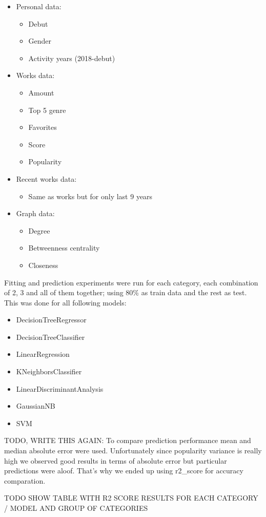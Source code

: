 \begin{itemize}
	\item Personal data:
	\begin{itemize}
		\item Debut
		\item Gender
		\item Activity years (2018-debut)
	\end{itemize}
	\item Works data:
	\begin{itemize}
		\item Amount
		\item Top 5 genre
		\item Favorites
		\item Score
		\item Popularity
	\end{itemize}
	\item Recent works data:
	\begin{itemize}
		\item Same as works but for only last 9 years
	\end{itemize}	
	\item Graph data:
	\begin{itemize}
		\item Degree
		\item Betweenness centrality
		\item Closeness
	\end{itemize}
\end{itemize}

Fitting and prediction experiments were run for each category, each combination of 2, 3 and all of them together; using 80\% as train data and the rest as test. This was done for all following models:
\begin{itemize}
	\item DecisionTreeRegressor
	\item DecisionTreeClassifier
	\item LinearRegression
	\item KNeighborsClassifier
	\item LinearDiscriminantAnalysis
	\item GaussianNB
	\item SVM
\end{itemize}

TODO, WRITE THIS AGAIN:
To compare prediction performance mean and median absolute error were used. Unfortunately since popularity variance is really high we observed good results in terms of absolute error but particular predictions were aloof. That's why we ended up using r2\_score for accuracy comparation. 

TODO SHOW TABLE WITH R2 SCORE RESULTS FOR EACH CATEGORY / MODEL AND GROUP OF CATEGORIES




